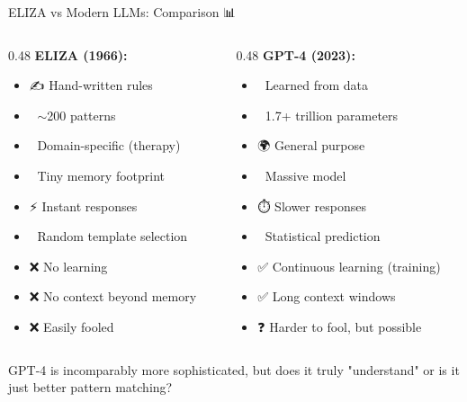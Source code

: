 \documentclass[aspectratio=169]{beamer}
\begin{document}
\begin{frame}[shrink=10]{ELIZA vs Modern LLMs: Comparison 📊}
\small
\begin{columns}
\begin{column}{0.48\textwidth}
\textbf{ELIZA (1966):}
\begin{itemize}\setlength{\itemsep}{0pt}
    \item ✍️ Hand-written rules
    \item 🔢 $\sim$200 patterns
    \item 🎯 Domain-specific (therapy)
    \item 💾 Tiny memory footprint
    \item ⚡ Instant responses
    \item 🎲 Random template selection
    \item ❌ No learning
    \item ❌ No context beyond memory
    \item ❌ Easily fooled
\end{itemize}
\end{column}

\begin{column}{0.48\textwidth}
\textbf{GPT-4 (2023):}
\begin{itemize}\setlength{\itemsep}{0pt}
    \item 🤖 Learned from data
    \item 🔢 1.7+ trillion parameters
    \item 🌍 General purpose
    \item 💾 Massive model
    \item ⏱️ Slower responses
    \item 🧮 Statistical prediction
    \item ✅ Continuous learning (training)
    \item ✅ Long context windows
    \item ❓ Harder to fool, but possible
\end{itemize}
\end{column}
\end{columns}

\vspace{0.3cm}

\begin{thinkaboutit}
GPT-4 is incomparably more sophisticated, but does it truly "understand" or is it just better pattern matching?
\end{thinkaboutit}
\end{frame}
\end{document}
